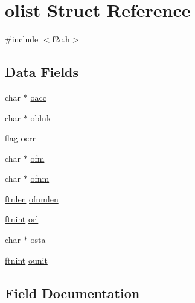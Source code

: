 \hypertarget{structolist}{}\section{olist Struct Reference}
\label{structolist}


{\ttfamily \#include $<$f2c.\+h$>$}

\subsection*{Data Fields}
\begin{DoxyCompactItemize}
\item 
char $\ast$ \hyperlink{structolist_a69a343a38b0039638429a3d32c852392}{oacc}
\item 
char $\ast$ \hyperlink{structolist_a5fb4b1710f4cabfc82e0b6ad6920750c}{oblnk}
\item 
\hyperlink{dependencies_2third-party_2clapack_23_82_81_2_f2_c_l_i_b_s_2libf2c_2f2c_8h_abf5d144da384425ae6cb542ce6eec8d3}{flag} \hyperlink{structolist_acb7f3c45380f7965c9ab177c228ed936}{oerr}
\item 
char $\ast$ \hyperlink{structolist_ad9142d9babc0ffb0afd363e9d246f88d}{ofm}
\item 
char $\ast$ \hyperlink{structolist_a5455ba5ab5b5b2b1e6ca9ec5b227cbeb}{ofnm}
\item 
\hyperlink{dependencies_2third-party_2clapack_23_82_81_2_f2_c_l_i_b_s_2libf2c_2f2c_8h_a2ad57b5f7f73e0131623aa6dbff6d3f3}{ftnlen} \hyperlink{structolist_a497ca7ef9c2e42d5cd30c847fdbd3f10}{ofnmlen}
\item 
\hyperlink{dependencies_2third-party_2clapack_23_82_81_2_f2_c_l_i_b_s_2libf2c_2f2c_8h_a9d70cdb573fb2bf020e1f6dba85fb1cc}{ftnint} \hyperlink{structolist_a4c83b168f7afdd6c81a7843193c5755e}{orl}
\item 
char $\ast$ \hyperlink{structolist_a39125d0805bc5bef366a1a3492c2fe68}{osta}
\item 
\hyperlink{dependencies_2third-party_2clapack_23_82_81_2_f2_c_l_i_b_s_2libf2c_2f2c_8h_a9d70cdb573fb2bf020e1f6dba85fb1cc}{ftnint} \hyperlink{structolist_af4443a6a577bfe9292cbf741c24c6e79}{ounit}
\end{DoxyCompactItemize}


\subsection{Field Documentation}
\mbox{\label{structolist_a69a343a38b0039638429a3d32c852392}} 
